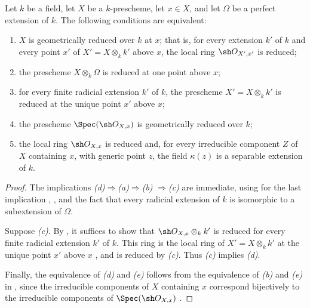 \begin{proposition}[4.6.12]
\label{IV.4.6.12}
Let $k$ be a field, let $X$ be a $k$-prescheme, let $x\in X$, and let
$\Omega$ be a perfect extension of $k$.
The following conditions are equivalent:
\begin{enumerate}
\item[\rm(a)]
\label{IV.4.6.12.a}
$X$ is geometrically reduced over $k$ at $x$; that is, for every
extension $k'$ of $k$ and every point $x'$ of
$X'=X\otimes_k k'$ above $x$, the local ring
$\sh O_{X',x'}$ is reduced;

\item[\rm(b)]
\label{IV.4.6.12.b}
the prescheme $X\otimes_k\Omega$ is reduced at one point above $x$;

\item[\rm(c)]
\label{IV.4.6.12.c}
for every finite radicial extension $k'$ of $k$, the prescheme
$X'=X\otimes_k k'$ is reduced at the unique point $x'$ above $x$;

\item[\rm(d)]
\label{IV.4.6.12.d}
the prescheme $\Spec(\sh O_{X,x})$ is geometrically reduced over $k$;

\item[\rm(e)]
\label{IV.4.6.12.e}
the local ring $\sh O_{X,x}$ is reduced and, for every irreducible
component $Z$ of $X$ containing $x$, with generic point $z$, the field
$\kappa(z)$ is a separable extension of $k$.
\end{enumerate}
\end{proposition}

\begin{proof}
The implications
\emph{(d)}$\Rightarrow$\emph{(a)}$\Rightarrow$\emph{(b)}
$\Rightarrow$\emph{(c)} are immediate, using for the last implication
, , and the fact that every radicial
extension of $k$ is isomorphic to a subextension of $\Omega$.

Suppose \emph{(c)}.
By , it suffices to show that
$\sh O_{X,x}\otimes_k k'$ is reduced for every finite radicial
extension $k'$ of $k$.
This ring is the local ring of $X'=X\otimes_k k'$ at the unique point
$x'$ above $x$  , and is reduced by
\emph{(c)}.
Thus \emph{(c)} implies \emph{(d)}.

Finally, the equivalence of \emph{(d)} and \emph{(e)} follows from the
equivalence of \emph{(b)} and \emph{(e)} in , since the
irreducible components of $X$ containing $x$ correspond bijectively
to the irreducible components of $\Spec(\sh O_{X,x})$
.
\end{proof}

